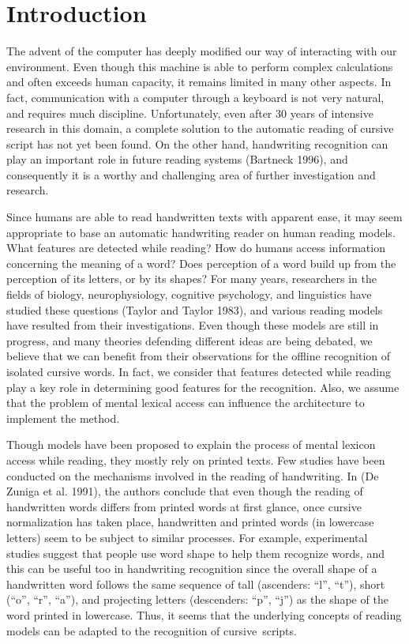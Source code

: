 \documentclass[ijdar]{svjour}
\begin{document}




\section{Introduction}
\label{sec:intro}

The advent of the computer has deeply modified our way of interacting
with our environment. Even though this machine is able to perform
complex calculations and often exceeds human capacity, it remains
limited in many other aspects. In fact, communication with a computer
through a keyboard is not very natural, and requires much discipline.
Unfortunately, even after 30 years of intensive research in this domain,
a complete solution to the automatic reading of cursive script has not
yet been found. On the other hand, handwriting recognition can play an
important role in future reading systems (Bartneck 1996), and
consequently it is a worthy and challenging area of further
investigation and research.

Since humans are able to read handwritten texts with apparent ease, it
may seem appropriate to base an automatic handwriting reader on human
reading models. What features are detected while reading? How do humans
access information concerning the meaning of a word? Does perception of
a word build up from the perception of its letters, or by its shapes?
For many years, researchers in the fields of biology, neurophysiology,
cognitive psychology, and linguistics have studied these questions
(Taylor and Taylor 1983), and various reading models have resulted from
their investigations. Even though these models are still in progress,
and many theories defending different ideas are being debated, we
believe that we can benefit from their observations for the offline
recognition of isolated cursive words. In fact, we consider that
features detected while reading play a key role in determining good
features for the recognition. Also, we assume that the problem of mental
lexical access can influence the architecture to implement the method.

Though models have been proposed to explain the process of mental
lexicon access while reading, they\break
mostly rely on printed texts. Few
studies have been conducted on the mechanisms involved in the reading of
handwriting. In (De Zuniga et al. 1991), the authors conclude that even
though the reading of handwritten words differs from printed words at
first glance, once cursive normalization has taken place, handwritten
and printed words (in lowercase letters) seem to be subject to similar
processes. For example, experimental studies suggest that people use
word shape to help them recognize words, and this can be useful too in
handwriting recognition since the overall shape of a handwritten word
follows the same sequence of tall (ascenders: ``l'', ``t''), short
(``o'', ``r'', ``a''), and projecting letters (descenders: ``p'', ``j'')
as the shape of the word printed in lowercase. Thus, it seems that the
underlying concepts of reading models can be adapted to the recognition
of \mbox{cursive scripts}.
\end{document}

